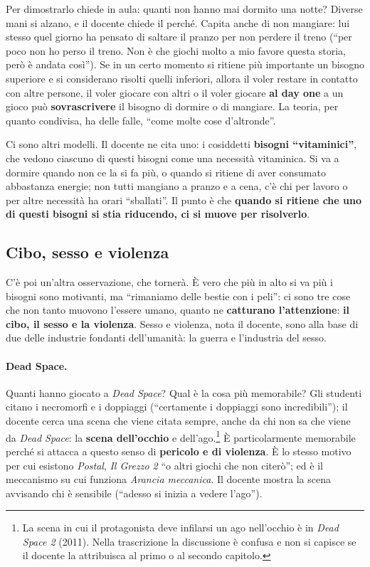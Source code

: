Per dimostrarlo chiede in aula: quanti non hanno mai dormito una notte? Diverse mani
si alzano, e il docente chiede il perché. Capita anche di non mangiare: lui stesso
quel giorno ha pensato di saltare il pranzo per non perdere il treno (``per poco non
ho perso il treno. Non è che giochi molto a mio favore questa storia, però è andata
così''). Se in un certo momento si ritiene più importante un bisogno superiore e si
considerano risolti quelli inferiori, allora il voler restare in contatto con altre
persone, il voler giocare con altri o il voler giocare \textbf{al day one} a un gioco
può \textbf{sovrascrivere} il bisogno di dormire o di mangiare. La teoria, per quanto
condivisa, ha delle falle, ``come molte cose d'altronde''.

Ci sono altri modelli. Il docente ne cita uno: i cosiddetti \textbf{bisogni
``vitaminici''}, che vedono ciascuno di questi bisogni come una necessità
vitaminica. Si va a dormire quando non ce la si fa più, o quando si ritiene di aver
consumato abbastanza energie; non tutti mangiano a pranzo e a cena, c'è chi per
lavoro o per altre necessità ha orari ``sballati''. Il punto è che \textbf{quando si
ritiene che uno di questi bisogni si stia riducendo, ci si muove per risolverlo}.

\subsection{Cibo, sesso e violenza}

C'è poi un'altra osservazione, che tornerà. È vero che più in alto si va più i
bisogni sono motivanti, ma ``rimaniamo delle bestie con i peli'': ci sono tre cose
che non tanto muovono l'essere umano, quanto ne \textbf{catturano l'attenzione}:
\textbf{il cibo, il sesso e la violenza}. Sesso e violenza, nota il docente, sono
alla base di due delle industrie fondanti dell'umanità: la guerra e l'industria del
sesso.

\paragraph{Dead Space.} Quanti hanno giocato a \emph{Dead Space}? Qual è la cosa più
memorabile? Gli studenti citano i necromorfi e i doppiaggi (``certamente i doppiaggi
sono incredibili''); il docente cerca una scena che viene citata sempre, anche da chi
non sa che viene da \emph{Dead Space}: la \textbf{scena dell'occhio} e
dell'ago.\footnote{La scena in cui il protagonista deve infilarsi un ago nell'occhio
è in \emph{Dead Space 2} (2011). Nella trascrizione la discussione è confusa e non si
capisce se il docente la attribuisca al primo o al secondo capitolo.} È
particolarmente memorabile perché si attacca a questo senso di \textbf{pericolo e di
violenza}. È lo stesso motivo per cui esistono \emph{Postal}, \emph{Il Grezzo 2} ``o
altri giochi che non citerò''; ed è il meccanismo su cui funziona \emph{Arancia
meccanica}. Il docente mostra la scena avvisando chi è sensibile (``adesso si inizia
a vedere l'ago'').

